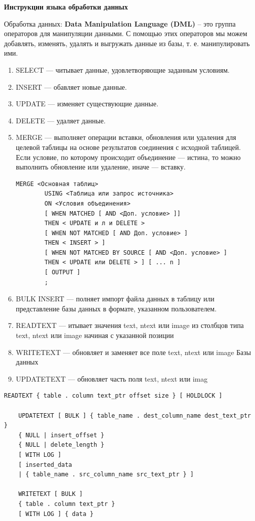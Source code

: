 \textbf{Инструкции языка обработки данных}

Обработка данных: \textbf{Data Manipulation Language (DML)} – это группа операторов для манипуляции данными. С помощью этих операторов мы можем добавлять, изменять, удалять и выгружать данные из базы, т. е. манипулировать ими.

\begin{enumerate}
	\item SELECT — читывает данные, удовлетворяющие заданным условиям.
	\item INSERT — обавляет новые данные.
	\item UPDATE — изменяет существующие данные.
	\item DELETE — удаляет данные.
	\item MERGE — выполняет операции вставки, обновления или удаления для целевой таблицы на основе результатов соединения с исходной таблицей. Если условие, по которому происходит объединение — истина, то можно выполнить обновление или удаление, иначе — вставку.
	
	\begin{lstlisting}[label=updatetext]
		MERGE <Основная таблиц>
		USING <Таблица или запрос источника>
		ON <Условия объединения>
		[ WHEN MATCHED [ AND <Доп. условие> ]]
		THEN < UPDATE и л и DELETE >
		[ WHEN NOT MATCHED [ AND Доп. условие> ]
		THEN < INSERT > ]
		[ WHEN NOT MATCHED BY SOURCE [ AND <Доп. условие> ]
		THEN < UPDATE или DELETE > ] [ ... n ]
		[ OUTPUT ]
		;
	\end{lstlisting}
	
	
	\item BULK INSERT — полняет импорт файла данных в таблицу или представление базы данных в формате, указанном пользователем.
	\item READTEXT — итывает значения text, ntext или image из столбцов типа text, ntext или image начиная
	с указанной позиции
	\item WRITETEXT — обновляет и заменяет все поле text, ntext или image
	Базы данных
	\item UPDATETEXT — обновляет часть поля text, ntext или imag
\end{enumerate}

\begin{lstlisting}[label=updatetext]
	READTEXT { table . column text_ptr offset size } [ HOLDLOCK ]
	
	UPDATETEXT [ BULK ] { table_name . dest_column_name dest_text_ptr }
	{ NULL | insert_offset }
	{ NULL | delete_length }
	[ WITH LOG ]
	[ inserted_data
	| { table_name . src_column_name src_text_ptr } ]
	
	WRITETEXT [ BULK ]
	{ table . column text_ptr }
	[ WITH LOG ] { data }
\end{lstlisting}

